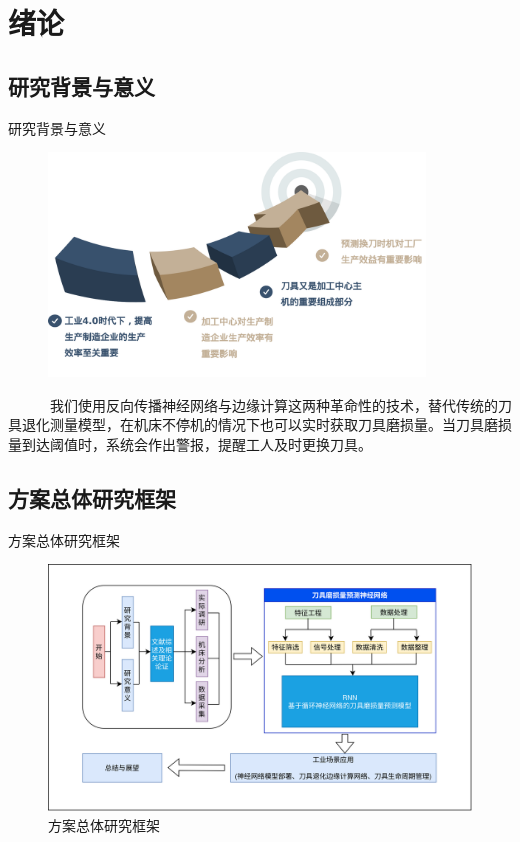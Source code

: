 
\section{绪论}
% 
\subsection{研究背景与意义}
\begin{frame}{研究背景与意义}
\begin{figure}[htp]
    \centering
    \includegraphics[width=10cm]{绪论/研究背景.png}
\end{figure}
\ \ \ \ \ \ 我们使用反向传播神经网络与边缘计算这两种革命性的技术，替代传统的刀具退化测量模型，在机床不停机的情况下也可以实时获取刀具磨损量。当刀具磨损量到达阈值时，系统会作出警报，提醒工人及时更换刀具。\par
\end{frame}
% 
% 

\subsection{方案总体研究框架}
\begin{frame}{方案总体研究框架}
% 
\begin{figure}[htp]
    \centering
    \includegraphics[width=12cm]{绪论/OpenIE研究架构.png}
    \caption{方案总体研究框架}
\end{figure}
% 
% 
\end{frame} 
% 

